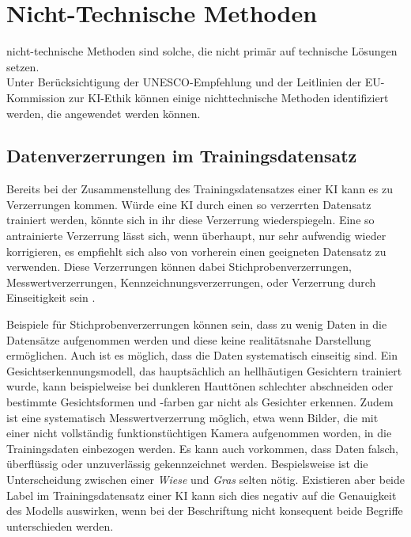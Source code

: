 \documentclass[12pt]{report}
\begin{document}
\section{Nicht-Technische Methoden}
nicht-technische Methoden sind solche, die nicht primär auf technische Lösungen setzen.\\
Unter Berücksichtigung der UNESCO-Empfehlung\cite{UNESCO} und der Leitlinien der EU-Kommission\cite{EUCommision} zur KI-Ethik können einige nichttechnische Methoden identifiziert werden, die angewendet werden können.

\subsection{Datenverzerrungen im Trainingsdatensatz}
Bereits bei der Zusammenstellung des Trainingsdatensatzes einer KI kann es zu Verzerrungen kommen. Würde eine KI durch einen so verzerrten Datensatz trainiert werden, könnte sich in ihr diese Verzerrung wiederspiegeln. Eine so antrainierte Verzerrung lässt sich, wenn überhaupt, nur sehr aufwendig wieder korrigieren, es empfiehlt sich also von vorherein einen geeigneten Datensatz zu verwenden.
Diese Verzerrungen können dabei Stichprobenverzerrungen, Messwertverzerrungen, Kennzeichnungsverzerrungen, oder Verzerrung durch Einseitigkeit sein \cite[S. 48ff.]{Srinivasan}.

Beispiele für Stichprobenverzerrungen können sein, dass zu wenig Daten in die Datensätze aufgenommen werden und diese keine realitätsnahe Darstellung ermöglichen.
Auch ist es möglich, dass die Daten systematisch einseitig sind. Ein Gesichtserkennungsmodell, das hauptsächlich an hellhäutigen Gesichtern trainiert wurde, kann beispielweise bei dunkleren Hauttönen schlechter abschneiden oder bestimmte Gesichtsformen und -farben gar nicht als Gesichter erkennen.
Zudem ist eine systematisch Messwertverzerrung möglich, etwa wenn Bilder, die mit einer nicht vollständig funktionstüchtigen Kamera aufgenommen worden, in die Trainingsdaten einbezogen werden.
Es kann auch vorkommen, dass Daten falsch, überflüssig oder unzuverlässig gekennzeichnet werden. Bespielsweise ist die Unterscheidung zwischen einer \textit{Wiese} und \textit{Gras} selten nötig. Existieren aber beide Label im Trainingsdatensatz einer KI kann sich dies negativ auf die Genauigkeit des Modells auswirken, wenn bei der Beschriftung nicht konsequent beide Begriffe unterschieden werden\cite[S. 48ff.]{Srinivasan}. 
\end{document}
